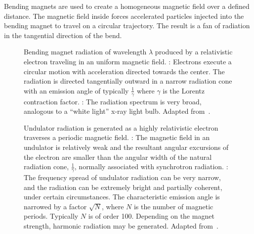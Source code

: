 Bending magnets are used to create a homogeneous magnetic field over a defined distance. The magnetic field inside forces accelerated particles injected into the bending magnet to travel on a circular trajectory. The result is a fan of radiation in the tangential direction of the bend.

\begin{figure}[h]
	\noindent{}
	\caption[Bending magnet radiation]{Bending magnet radiation of wavelength $\lambda$ produced by a relativistic electron traveling in an uniform magnetic field. %
		: Electrons execute a circular motion with acceleration directed towards the center. The radiation is directed tangentially outward in a narrow radiation cone with an emission angle of typically $\frac{1}{\gamma}$ where $\gamma$ is the Lorentz contraction factor. %
		: The radiation spectrum is very broad, analogous to a ``white light'' x-ray light bulb.%
		Adapted from~\cite{Attwood2007}.}%
	\label{fig:bending magnets}
\end{figure}

\begin{figure}
	\noindent{}
	\caption[Undulator radiation]{Undulator radiation is generated as a highly relativistic electron traverses a periodic magnetic field.%
		: The magnetic field in an undulator is relatively weak and the resultant angular excursions of the electron are smaller than the angular width of the natural radiation cone, $\frac{1}{\gamma}$, normally associated with synchrotron radiation.%
		: The frequency spread of undulator radiation can be very narrow, and the radiation can be extremely bright and partially coherent, under certain circumstances. The characteristic emission angle is narrowed by a factor $\sqrt N$, where $N$ is the number of magnetic periods. Typically $N$ is of order 100. Depending on the magnet strength, harmonic radiation may be generated. Adapted from~\cite{Attwood2007}.}%
	\label{fig:undulator}
\end{figure}

